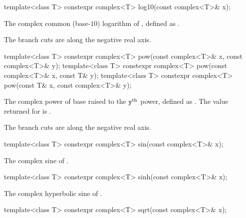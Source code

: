 %
\begin{itemdecl}
template<class T> constexpr complex<T> log10(const complex<T>& x);
\end{itemdecl}

\begin{itemdescr}
\pnum
\returns
The complex common (base-$10$) logarithm of , defined as
.

\pnum
\remarks
The branch cuts are along the negative real axis.
\end{itemdescr}

%
\begin{itemdecl}
template<class T> constexpr complex<T> pow(const complex<T>& x, const complex<T>& y);
template<class T> constexpr complex<T> pow(const complex<T>& x, const T& y);
template<class T> constexpr complex<T> pow(const T& x, const complex<T>& y);
\end{itemdecl}

\begin{itemdescr}
\pnum
\returns
The complex power of base  raised to the $\tcode{y}^\text{th}$ power,
defined as
.
The value returned for
is .

\pnum
\remarks
The branch cuts are along the negative real axis.
\end{itemdescr}

%
\begin{itemdecl}
template<class T> constexpr complex<T> sin(const complex<T>& x);
\end{itemdecl}

\begin{itemdescr}
\pnum
\returns
The complex sine of .
\end{itemdescr}

%
\begin{itemdecl}
template<class T> constexpr complex<T> sinh(const complex<T>& x);
\end{itemdecl}

\begin{itemdescr}
\pnum
\returns
The complex hyperbolic sine of .
\end{itemdescr}

%
\begin{itemdecl}
template<class T> constexpr complex<T> sqrt(const complex<T>& x);
\end{itemdecl}

